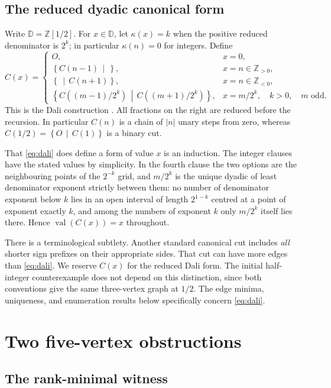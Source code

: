 \documentclass[11pt,a4paper]{article}
\numberwithin{equation}{section}
\theoremstyle{definition}
\theoremstyle{remark}
\newcommand{\D}{\mathbb{D}}
\newcommand{\Z}{\mathbb{Z}}
\newcommand{\val}{\operatorname{val}}
\newcommand{\cut}[2]{\left\{#1\,\middle|\,#2\right\}}
\newcommand{\can}{C}
\begin{document}
\subsection{The reduced dyadic canonical form}

Write $\D=\Z[1/2]$. For $x\in\D$, let $\kappa(x)=k$ when the positive reduced
denominator is $2^k$; in particular $\kappa(n)=0$ for integers. Define
\begin{equation}
\label{eq:dali}
\can(x)=
\begin{cases}
 O,&x=0,\\
 \cut{\can(n-1)}{},&x=n\in\Z_{>0},\\
 \cut{}{\can(n+1)},&x=n\in\Z_{<0},\\
 \displaystyle\cut{\can((m-1)/2^k)}{\can((m+1)/2^k)},
   &x=m/2^k,\quad k>0,\quad m\text{ odd}.
\end{cases}
\end{equation}
This is the Dali construction \cite[Eq.~(2.71)]{Tondering2019}. All fractions on
the right are reduced before the recursion. In particular $\can(n)$ is a chain of
$|n|$ unary steps from zero, whereas $\can(1/2)=\cut{O}{\can(1)}$ is a binary cut.

That \eqref{eq:dali} does define a form of value $x$ is an induction. The integer
clauses have the stated values by simplicity. In the fourth clause the two
options are the neighbouring points of the $2^{-k}$ grid, and $m/2^k$ is the
unique dyadic of least denominator exponent strictly between them: no number of
denominator exponent below $k$ lies in an open interval of length $2^{1-k}$
centred at a point of exponent exactly $k$, and among the numbers of exponent $k$
only $m/2^k$ itself lies there. Hence $\val(\can(x))=x$ throughout.

There is a terminological subtlety. Another standard canonical cut includes
\emph{all} shorter sign prefixes on their appropriate sides. That cut can have
more edges than \eqref{eq:dali}. We reserve $\can(x)$ for the reduced Dali form.
The initial half-integer counterexample does not depend on this distinction,
since both conventions give the same three-vertex graph at $1/2$. The edge
minima, uniqueness, and enumeration results below specifically concern
\eqref{eq:dali}.

\section{Two five-vertex obstructions}
\label{sec:pentagon}

\subsection{The rank-minimal witness}
\end{document}
